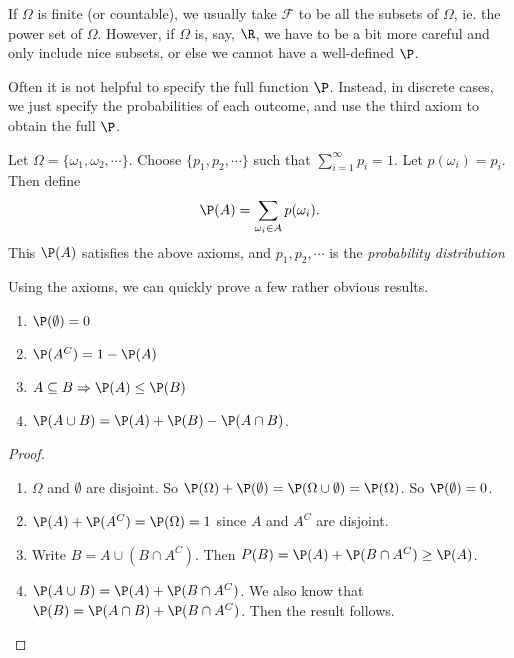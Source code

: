 \documentclass[a4paper]{article}
\begin{document}
If $\Omega$ is finite (or countable), we usually take $\mathcal{F}$ to be all the subsets of $\Omega$, ie. the power set of $\Omega$. However, if $\Omega$ is, say, $\R$, we have to be a bit more careful and only include nice subsets, or else we cannot have a well-defined $\P$.

Often it is not helpful to specify the full function $\P$. Instead, in discrete cases, we just specify the probabilities of each outcome, and use the third axiom to obtain the full $\P$.

\begin{defi}
  Let $\Omega = \{\omega_1, \omega_2, \cdots\}$. Choose $\{p_1, p_2, \cdots \}$ such that $\sum_{i = 1}^\infty p_i= 1$. Let $p(\omega_i) = p_i$. Then define
  \[
    \P(A) = \sum_{\omega_i\in A} p(\omega_i).
  \]
  This $\P(A)$ satisfies the above axioms, and $p_1, p_2, \cdots$ is the \emph{probability distribution}
\end{defi}

Using the axioms, we can quickly prove a few rather obvious results.
\begin{thm}\leavevmode
  \begin{enumerate}
    \item $\P(\emptyset) = 0$
    \item $\P(A^C) = 1 - \P(A)$
    \item $A\subseteq B \Rightarrow \P(A) \leq \P(B)$
    \item $\P (A\cup B) = \P(A) + \P(B) - \P(A\cap B)$.
  \end{enumerate}
\end{thm}

\begin{proof}\leavevmode
  \begin{enumerate}
    \item $\Omega$ and $\emptyset$ are disjoint. So $\P(\Omega) + \P(\emptyset) = \P(\Omega \cup \emptyset) = \P(\Omega)$. So $\P(\emptyset) = 0$.
    \item $\P(A) + \P(A^C) = \P(\Omega) = 1$ since $A$ and $A^C$ are disjoint.
    \item Write $B = A\cup (B\cap A^C)$. Then $\\P(B) = \P(A) + \P(B\cap A^C) \geq \P(A)$.
    \item $\P(A\cup B) = \P(A) + \P(B\cap A^C)$. We also know that $\P(B) = \P(A\cap B) + \P(B\cap A^C)$. Then the result follows.
  \end{enumerate}
\end{proof}
\end{document}
